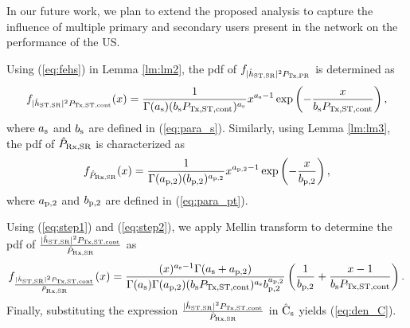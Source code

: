In our future work, we plan to extend the proposed analysis to capture the influence of multiple primary and secondary users present in the network on the performance of the US.  
 \label{ap:one}
\begin{IEEEproof}
Using (\ref{eq:fehs}) in Lemma \ref{lm:lm2}, the pdf of $f_{|\hat{h}_{\text{ST,SR}}|^2 P_{\text{Tx,PR}}}$ is determined as
\begin{align}
f_{\epgs \preg}(x) = \frac{1}{\Gamma(\as) (\bs \preg)^{\as}} x^{\as - 1} \exp\left( - \frac{x}{ \bs \preg} \right), \label{eq:step1} 
\end{align}
where $a_{\text{s}}$ and $b_{\text{s}}$ are defined in (\ref{eq:para_s}).
Similarly, using Lemma \ref{lm:lm3}, the pdf of $\hat{P}_{\text{Rx,SR}}$ is characterized as
\begin{align}
f_{\eprcvdsr}(x) = \frac{1}{\Gamma(\apt) (\bpt)^{\apt}} x^{\apt - 1} \exp\left( - \frac{x}{ \bpt} \right), \label{eq:step2} 
\end{align}
where $a_{\text{p,2}}$ and $b_{\text{p,2}}$ are defined in (\ref{eq:para_pt}).

Using (\ref{eq:step1}) and (\ref{eq:step2}), we apply Mellin transform \cite{NIST} to determine the pdf of $\frac{|\hat{h}_{\text{ST,SR}}|^2 P_{\text{Tx,ST,cont}}}{\hat{P}_{\text{Rx,SR}}}$ as
\begin{align}
f_{\frac{|\hat{h}_{\text{ST,SR}}|^2 P_{\text{Tx,ST,cont}}}{\hat{P}_{\text{Rx,SR}}}}(x) = \frac{(x)^{a_{\text{s}} - 1} \Gamma(a_{\text{s}} + a_{\text{p,2}})}{\Gamma(a_{\text{s}}) \Gamma(a_{\text{p,2}}) (b_{\text{s}} P_{\text{Tx,ST,cont}}) ^{a_{\text{s}}} b_{\text{p,2}}^{a_{\text{p,2}}}} \left(\frac{1}{b_{\text{p,2}}} + \frac{x - 1}{b_{\text{s}} P_{\text{Tx,ST,cont}}}\right).
\end{align}
Finally, substituting the expression $\frac{|\hat{h}_{\text{ST,SR}}|^2 P_{\text{Tx,ST,cont}}}{\hat{P}_{\text{Rx,SR}}}$ in $\hat{\text{{C}}}_{\text{s}}$ yields (\ref{eq:den_C}).
\end{IEEEproof}
